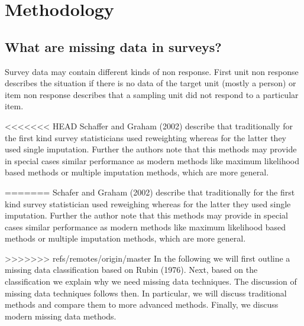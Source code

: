 \section{Methodology}

\subsection{What are missing data in surveys?}

Survey data may contain different kinds of non response. First unit non response describes the situation if there is no data of the target unit (mostly a person) or item non response describes that a sampling unit did not respond to a particular item. \par
<<<<<<< HEAD
Schaffer and Graham (2002) describe that traditionally for the first kind survey statisticians used reweighting whereas for the latter they used single imputation.
Further the authors note that this methods may provide in special cases similar performance as modern methods like maximum likelihood based methods or multiple imputation methods, which are more general. \par
=======
Schafer and Graham (2002) describe that traditionally for the first kind survey statistician used reweighing whereas for the latter they used single imputation.
 Further the author note that this methods may provide in special cases similar performance as modern methods like maximum likelihood based methods or multiple imputation methods, which are more general.  \par
>>>>>>> refs/remotes/origin/master
In the following we will first outline a missing data classification based on Rubin (1976). 
Next, based on the classification we explain why we need missing data techniques. 
The discussion of missing data techniques follows then. In particular, we will discuss traditional methods and compare them to more advanced methods. 
Finally, we discuss modern missing data methods. \par

